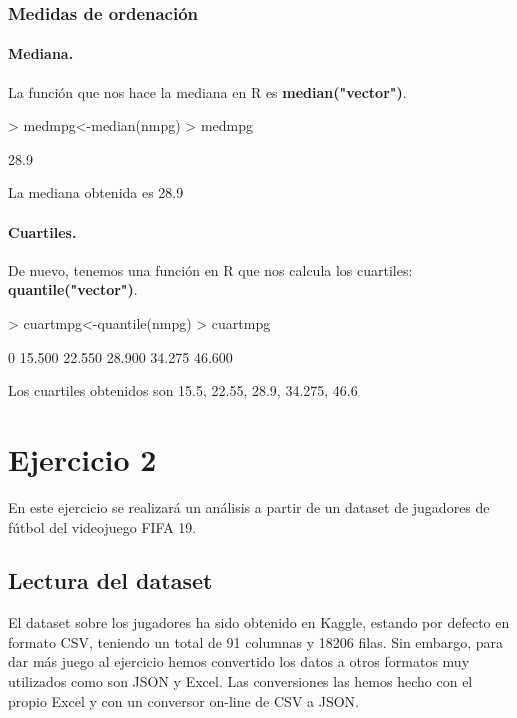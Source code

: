 \documentclass [a4paper] {article}
\begin{document}
\subsubsection{Medidas de ordenación}
\paragraph{Mediana.}
La función que nos hace la mediana en R es \textbf{median("vector")}.
\begin{Schunk}
\begin{Sinput}
> medmpg<-median(nmpg)
> medmpg
\end{Sinput}
\begin{Soutput}
[1] 28.9
\end{Soutput}
\end{Schunk}

La mediana obtenida es 28.9

\paragraph{Cuartiles.}
De nuevo, tenemos una función en R que nos calcula los cuartiles: \textbf{quantile("vector")}.
\begin{Schunk}
\begin{Sinput}
> cuartmpg<-quantile(nmpg)
> cuartmpg
\end{Sinput}
\begin{Soutput}
    0%
15.500 22.550 28.900 34.275 46.600 
\end{Soutput}
\end{Schunk}

Los cuartiles obtenidos son 15.5, 22.55, 28.9, 34.275, 46.6

\section{Ejercicio 2}
En este ejercicio se realizará un análisis a partir de un dataset de jugadores de fútbol del videojuego FIFA 19.

\subsection{Lectura del dataset}
El dataset sobre los jugadores ha sido obtenido en Kaggle, estando por defecto en formato CSV, teniendo un total de 91 columnas y 18206 filas. Sin embargo, para dar más juego
al ejercicio hemos convertido los datos a otros formatos muy utilizados como son JSON y Excel. Las conversiones las hemos hecho con el propio 
Excel y con un conversor on-line de CSV a JSON.
\end{document}
